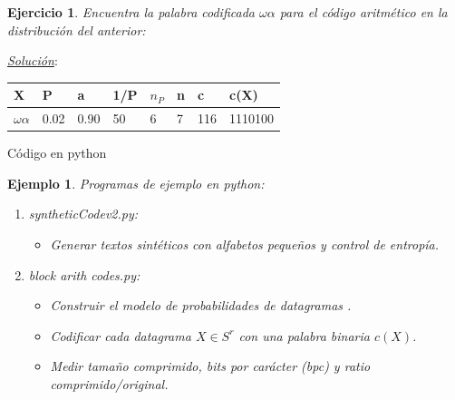\documentclass{beamer}
\theoremstyle{plain}
\theoremstyle{example}
\newtheorem{ejercicio} [Ejercicio]{Ejercicio}
\theoremstyle{example}
\newtheorem{ejemplo} [Ejemplo] {Ejemplo}
\begin{document}
\begin{frame}  \small 


\begin{ejercicio}

Encuentra la palabra codificada  $\omega\alpha$ para el código aritmético en la distribución del anterior:
\end{ejercicio}

\pause
\textit{\underline{Solución}}:\\ 

\begin{center}
 \begin{tabular}{ l l l l l l l l}\hline
        		 X              & P       &   a     & 1/P & $n_P$  & n & c     & c(X)\\\hline\hline
   $\omega\alpha$    & 0.02 & 0.90	 & 50   & 6        & 7  & 116  & 1110100\\\hline
   \end{tabular}
\end{center}
\end{frame} 

\begin{frame}{Código en python}  \footnotesize

\begin{ejemplo}

Programas de ejemplo en python:

\begin{enumerate}
    \item syntheticCodev2.py: 
        \begin{itemize}
              \item  Generar textos sintéticos con alfabetos pequeños y control de entropía.
             \end{itemize}
            
    \item block arith codes.py:
    
            \begin{itemize}
              \item Construir el modelo de probabilidades de \alert{datagramas} .
              \item Codificar cada datagrama \(X\in S^r\) con una palabra binaria \(c(X)\).
              \item Medir tamaño comprimido, \emph{bits por carácter} (bpc) y \emph{ratio} comprimido/original.
            \end{itemize}
\end{enumerate}

\end{ejemplo}


\end{frame} 
\end{document}
